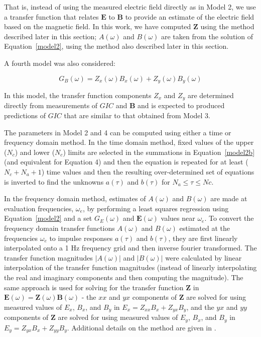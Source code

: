 \documentclass[draft,linenumbers]{agujournal2018}
\begin{document}
That is, instead of using the measured electric field directly as in Model 2, we use a transfer function that relates $\mathbf{E}$ to $\mathbf{B}$ to provide an estimate of the electric field based on the magnetic field. In this work, we have computed $\mathbf{Z}$ using the method described later in this section; $A(\omega)$ and $B(\omega)$ are taken from the solution of Equation~\ref{model2}, using the method also described later in this section.

A fourth model was also considered:

\begin{linenomath*}
\begin{equation}
G_B(\omega) = Z_x(\omega)B_x(\omega) + Z_y(\omega)B_y(\omega)
\end{equation}
\end{linenomath*}

\noindent
In this model, the transfer function components $Z_x$ and $Z_y$ are determined directly from measurements of $GIC$ and $\mathbf{B}$ and is expected to produced predictions of $GIC$ that are similar to that obtained from Model 3.

The parameters in Model 2 and 4 can be computed using either a time or frequency domain method. In the time domain method, fixed values of the upper ($N_c$) and lower ($N_c$) limits are selected in the summations in Equation~\ref{model2b} (and equivalent for Equation 4) and then the equation is repeated for at least ($N_c+N_a+1$) time values and then the resulting over-determined set of equations is inverted to find the unknowns $a(\tau)$ and $b(\tau)$ for $N_a \le \tau \le Nc$.

In the frequency domain method, estimates of $A(\omega)$ and $B(\omega)$ are made at evaluation frequencies, $\omega_e$, by performing a least squares regression using Equation~\ref{model2} and a set $G_E(\omega)$ and $\mathbf{E}(\omega)$ values near $\omega_e$. To convert the frequency domain transfer functions $A(\omega)$ and $B(\omega)$ estimated at the frequencies $\omega_e$ to impulse responses $a(\tau)$ and $b(\tau)$, they are first linearly interpolated onto a 1 Hz frequency grid and then inverse fourier transformed. The transfer function magnitudes $|A(\omega)|$ and $|B(\omega)|$ were calculated by linear interpolation of the transfer function magnitudes (instead of linearly interpolating the real and imaginary components and then computing the magnitude). The same approach is used for solving for the transfer function $\mathbf{Z}$ in $\mathbf{E}(\omega) = \mathbf{Z}(\omega)\mathbf{B}(\omega)$ - the $xx$ and $yx$ components of $\mathbf{Z}$ are solved for using measured values of $E_x$, $B_x$, and $B_y$ in $E_x = Z_{xx}B_x + Z_{yx}B_{y}$, and the $yx$ and $yy$ components of $\mathbf{Z}$ are solved for using measured values of $E_y$, $B_x$, and $B_y$ in $E_y = Z_{yx}B_x + Z_{yy}B_y$. Additional details on the method are given in \cite[][and references therein.]{Weigel2017}.
\end{document}
